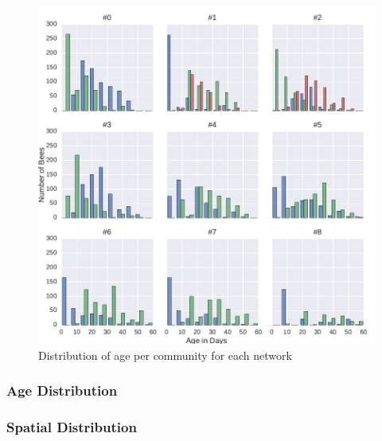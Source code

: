 \begin{figure}[htb]
	\centering
	\includegraphics[width=1.0\textwidth]{Figures/ageDistribution}
	\caption{Distribution of age per community for each network}
	\label{fig:ageDist}
\end{figure}


\subsubsection{Age Distribution}

\subsubsection{Spatial Distribution}
